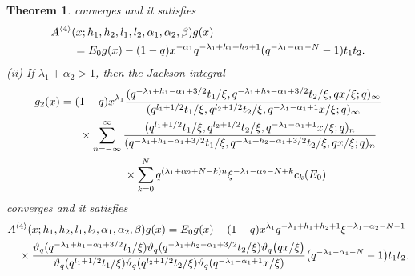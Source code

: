 \documentclass[10pt,a4paper]{amsart}
\newtheorem{thm}{Theorem}
\begin{document}
\begin{thm}
converges and it satisfies
  \begin{align}
    &A^{\langle 4 \rangle} (x; h_{1}, h_{2}, l_{1}, l_{2}, \alpha_{1}, \alpha_{2}, \beta) g (x) \label{eq:2qHnonh1} \\
    &\qquad = E_0 g (x) - (1 - q) x^{- \alpha_{1}}q^{ - \lambda _{1} + h_{1} + h_{2} + 1 }(q^{- \lambda _{1} - \alpha _{1} - N} - 1)t_{1}t_{2} . \notag
  \end{align}
(ii) If  $ \lambda _{1} + \alpha _{2}  > 1$, then the Jackson integral
  \begin{align*}
    &g _2 (x) = (1 - q) x^{ \lambda _{1} } \frac{(q^{-  \lambda _{1} + h_{1} - \alpha _{1} + 3/2}t_{1}/\xi, q^{ - \lambda _{1} +h_{2} - \alpha _{1} + 3/2}t_{2}/\xi, qx/\xi; q)_{\infty}}{(q^{l_{1} + 1/2}t_{1}/\xi, q^{l_{2} + 1/2}t_{2}/\xi, q^{- \lambda _{1} - \alpha _{1} + 1}x/\xi; q)_{\infty}} \\
    & \qquad \qquad \times \sum_{n = -\infty}^{\infty} \frac{(q^{l_{1} + 1/2}t_{1}/\xi, q^{l_{2} + 1/2}t_{2}/\xi, q^{- \lambda _{1} - \alpha _{1} + 1 }x/\xi; q)_{n}}{(q^{- \lambda _{1} + h_{1} - \alpha _{1} + 3/2}t_{1}/\xi, q^{- \lambda _{1} + h_{2} - \alpha _{1} + 3/2}t_{2}/\xi, qx/\xi; q)_{n}} \\
    & \qquad \qquad \qquad \qquad \times \sum_{k = 0}^{N} q^{( \lambda _{1}  + \alpha_{2}+ N -k)n} \xi^{- \lambda _{1}  -\alpha_{2} - N + k} c_{k}(E_0) \notag
  \end{align*}
converges and it satisfies
  \begin{align*}
    & A^{\langle 4 \rangle} (x; h_{1}, h_{2}, l_{1}, l_{2}, \alpha_{1}, \alpha_{2}, \beta) g(x) = E_0 g(x) - (1 - q) x^{ \lambda _{1} } q^{ - \lambda _{1} + h_{1} + h_{2} + 1} \xi^{- \lambda _{1} -\alpha_{2}  - N  -1}  \\
    & \quad \times \frac{\vartheta _q (q^{- \lambda _{1} + h_{1} - \alpha _{1} + 3/2}t_{1}/\xi) \vartheta _q (q^{- \lambda _{1} + h_{2} - \alpha _{1} + 3/2}t_{2}/\xi) \vartheta_{q} \big(qx/\xi \big)}{\vartheta _q (q^{l_{1} + 1/2}t_{1}/\xi) \vartheta _q (q^{l_{2} + 1/2}t_{2}/\xi) \vartheta_{q} (q^{- \lambda _{1} - \alpha _{1} + 1 } x/\xi )} \big( q^{ - \lambda _{1} - \alpha _{1} -N} - 1 \big) t_{1} t_{2} . \notag

\end{align*}
\end{thm}
\end{document}
